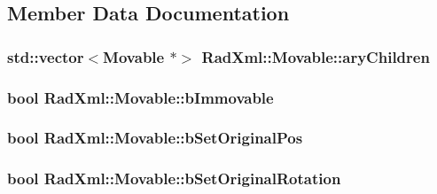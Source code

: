 \subsection{Member Data Documentation}
\hypertarget{class_rad_xml_1_1_movable_ade16ade0ce2baf111d16c42769dfacfe}{
\subsubsection[{ary\-Children}]{\setlength{\rightskip}{0pt plus 5cm}std\-::vector$<${\bf Movable} $\ast$$>$ Rad\-Xml\-::\-Movable\-::ary\-Children\hspace{0.3cm}{\ttfamily [protected]}}}\label{class_rad_xml_1_1_movable_ade16ade0ce2baf111d16c42769dfacfe}
\hypertarget{class_rad_xml_1_1_movable_abe3d4c7ad61050d4d6a70214b81fff80}{
\subsubsection[{b\-Immovable}]{\setlength{\rightskip}{0pt plus 5cm}bool Rad\-Xml\-::\-Movable\-::b\-Immovable\hspace{0.3cm}{\ttfamily [protected]}}}\label{class_rad_xml_1_1_movable_abe3d4c7ad61050d4d6a70214b81fff80}
\hypertarget{class_rad_xml_1_1_movable_a5b99344718f5aa2c1bc557757e9a9b20}{
\subsubsection[{b\-Set\-Original\-Pos}]{\setlength{\rightskip}{0pt plus 5cm}bool Rad\-Xml\-::\-Movable\-::b\-Set\-Original\-Pos\hspace{0.3cm}{\ttfamily [protected]}}}\label{class_rad_xml_1_1_movable_a5b99344718f5aa2c1bc557757e9a9b20}
\hypertarget{class_rad_xml_1_1_movable_ae69b59a54075a9a64e6865e482e7cef0}{
\subsubsection[{b\-Set\-Original\-Rotation}]{\setlength{\rightskip}{0pt plus 5cm}bool Rad\-Xml\-::\-Movable\-::b\-Set\-Original\-Rotation\hspace{0.3cm}{\ttfamily [protected]}}}\label{class_rad_xml_1_1_movable_ae69b59a54075a9a64e6865e482e7cef0}
